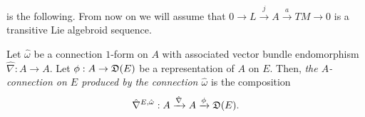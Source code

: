  is the following. From now on we will assume that $0 \to L \xrightarrow{j} A \xrightarrow{a} TM \to 0$ is a transitive Lie algebroid sequence.

\begin{definition}\label{definitionProducedAConnection}
Let $\hat \omega$ be a connection $1$-form on $A$ with associated vector bundle endomorphism $\hat \nabla:A \to A$. Let $\phi: A \to \alg D(E)$ be a representation of $A$ on $E$. Then, \emph{the $A$-connection on $E$ produced by the connection $\hat \omega$} is the composition
\begin{equation}
    \hat \nabla^{E, \hat \omega} : A \xrightarrow{\hat \nabla} A \xrightarrow{\phi} \alg D(E).
\end{equation}
\end{definition}

